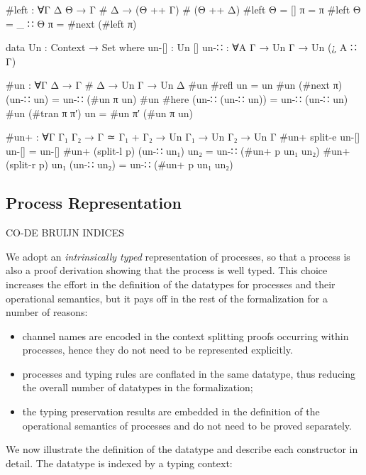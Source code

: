 \begin{code}
#left : ∀{Γ Δ Θ} → Γ # Δ → (Θ ++ Γ) # (Θ ++ Δ)
#left {Θ = []} π = π
#left {Θ = _ ∷ Θ} π = #next (#left π)

data Un : Context → Set where
  un-[]  : Un []
  un-∷   : ∀{A Γ} → Un Γ → Un (¿ A ∷ Γ)

#un : ∀{Γ Δ} → Γ # Δ → Un Γ → Un Δ
#un #refl un = un
#un (#next π) (un-∷ un) = un-∷ (#un π un)
#un #here (un-∷ (un-∷ un)) = un-∷ (un-∷ un)
#un (#tran π π′) un = #un π′ (#un π un)

#un+ : ∀{Γ Γ₁ Γ₂} → Γ ≃ Γ₁ + Γ₂ → Un Γ₁ → Un Γ₂ → Un Γ
#un+ split-e un-[] un-[] = un-[]
#un+ (split-l p) (un-∷ un₁) un₂ = un-∷ (#un+ p un₁ un₂)
#un+ (split-r p) un₁ (un-∷ un₂) = un-∷ (#un+ p un₁ un₂)
\end{code}

\subsection{Process Representation}
\label{sec:process-agda}

CO-DE BRUIJN INDICES

We adopt an \emph{intrinsically typed} representation of processes, so that a
process is also a proof derivation showing that the process is well typed. This
choice increases the effort in the definition of the datatypes for processes and
their operational semantics, but it pays off in the rest of the formalization
for a number of reasons:

\begin{itemize}
\item channel names are encoded in the context splitting proofs occurring within
  processes, hence they do not need to be represented explicitly.
\item processes and typing rules are conflated in the same datatype, thus
  reducing the overall number of datatypes in the formalization;
\item the typing preservation results are embedded in the definition of the
  operational semantics of processes and do not need to be proved separately.
\end{itemize}

We now illustrate the definition of the  datatype and
describe each constructor in detail. The datatype is indexed by a typing
context:

